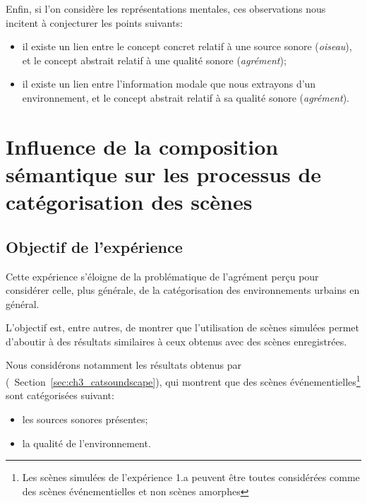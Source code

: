 Enfin, si l'on considère les représentations mentales, ces observations nous incitent à conjecturer les points suivants:
 
\begin{itemize}
\item  il existe un lien entre le concept concret relatif à une source sonore (\emph{oiseau}), et le concept abstrait relatif à une qualité sonore (\emph{agrément});
\item  il existe un lien entre l'information modale que nous extrayons d'un environnement, et le concept abstrait relatif à sa qualité sonore (\emph{agrément}).
\end{itemize}

\section[Composition sémantique et catégorisation]{Influence de la composition sémantique sur les processus de catégorisation des scènes}
\label{sec:xp4}

\subsection{Objectif de l'expérience}
\label{sec:ch5_objXp3}

Cette  expérience s'éloigne de la problématique de l'agrément perçu pour considérer celle, plus générale, de la catégorisation des environnements urbains en général. 

L'objectif est, entre autres, de montrer que l’utilisation de scènes simulées permet d'aboutir à des résultats similaires à ceux obtenus avec des scènes enregistrées.

Nous considérons notamment les résultats obtenus par \citep{maffiolo_caracterisation_1999} (\cf~Section~\ref{sec:ch3_catsoundscape}), qui montrent que des scènes événementielles\footnote{Les scènes simulées de l'expérience 1.a peuvent être toutes considérées comme des scènes événementielles et non scènes amorphes} sont catégorisées suivant:

\begin{itemize}
\item les sources sonores présentes;
\item la qualité de l'environnement.
\end{itemize}

